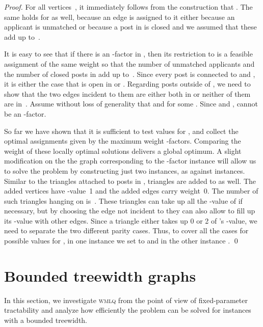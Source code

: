 \documentclass{llncs}
\begin{document}
\begin{proof}
For all vertices~, it immediately follows from the construction that . The same holds for  as well, because an edge is assigned to it either because an applicant is unmatched or because a post in  is closed and we assumed that these add up to~. 

It is easy to see that if there is an -factor  in , then its restriction to  is a feasible assignment  of the same weight so that the number of unmatched applicants and the number of closed posts in  add up to~. Since every post  is connected to  and , it is either the case that  is open in  or . Regarding posts outside of , we need to show that the two edges incident to them are either both in  or neither of them are in~. Assume without loss of generality that  and  for some . Since  and ,  cannot be an -factor.

So far we have shown that it is sufficient to test   values for , and collect the optimal assignments given by the maximum weight -factors. Comparing the weight of these locally optimal solutions delivers a global optimum. A slight modification on the the graph corresponding to the -factor instance will allow us to solve the problem by constructing just two instances, as against  instances. Similar to the triangles attached to posts in , triangles are added to  as well. The added vertices have -value~1 and the added edges carry weight~0. The number of such triangles hanging on  is~. These triangles can take up all the -value of  if necessary, but by choosing the edge not incident to  they can also allow  to fill up its -value with other edges. Since a triangle either takes up 0 or 2 of 's -value, we need to separate the two different parity cases. Thus, to cover all the  cases for possible values for , in one instance we set  to  and in the other instance .
\qed
\end{proof}











\section{Bounded treewidth graphs}
\label{sec:bounded_tw}

In this section, we investigate \textsc{wmlq} from the point of view of fixed-parameter tractability and analyze how efficiently the problem can be solved for instances with a bounded treewidth.
\end{document}
